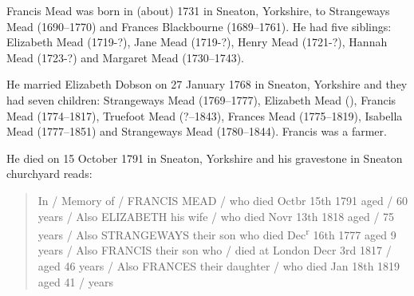 
Francis Mead was born in (about) 1731 in Sneaton, Yorkshire, to Strangeways Mead (1690--1770) and Frances Blackbourne (1689--1761). He had five siblings: Elizabeth Mead (1719-?), Jane Mead (1719-?), Henry Mead (1721-?), Hannah Mead (1723-?) and Margaret Mead (1730--1743). 

He married Elizabeth Dobson on 27 January 1768 in Sneaton, Yorkshire and they had seven children:  Strangeways Mead (1769--1777), Elizabeth Mead (), Francis Mead (1774--1817), Truefoot Mead (?--1843), Frances Mead (1775--1819), Isabella Mead (1777--1851) and Strangeways Mead (1780--1844). Francis was a farmer.

He died on 15 October 1791 in Sneaton, Yorkshire \cite{FMeadDeath} and his gravestone in Sneaton churchyard reads:

\begin{quotation}
In / Memory of / FRANCIS MEAD / who died Octbr 15th 1791 aged / 60 years / Also ELIZABETH his wife / who died Novr 13th 1818 aged / 75 years / Also STRANGEWAYS their son who died Dec\textsuperscript{r} 16th 1777 aged 9 years / Also FRANCIS their son who / died at London Decr 3rd 1817 / aged 46 years / Also FRANCES their daughter / who died Jan 18th 1819 aged 41 / years
\end{quotation}
